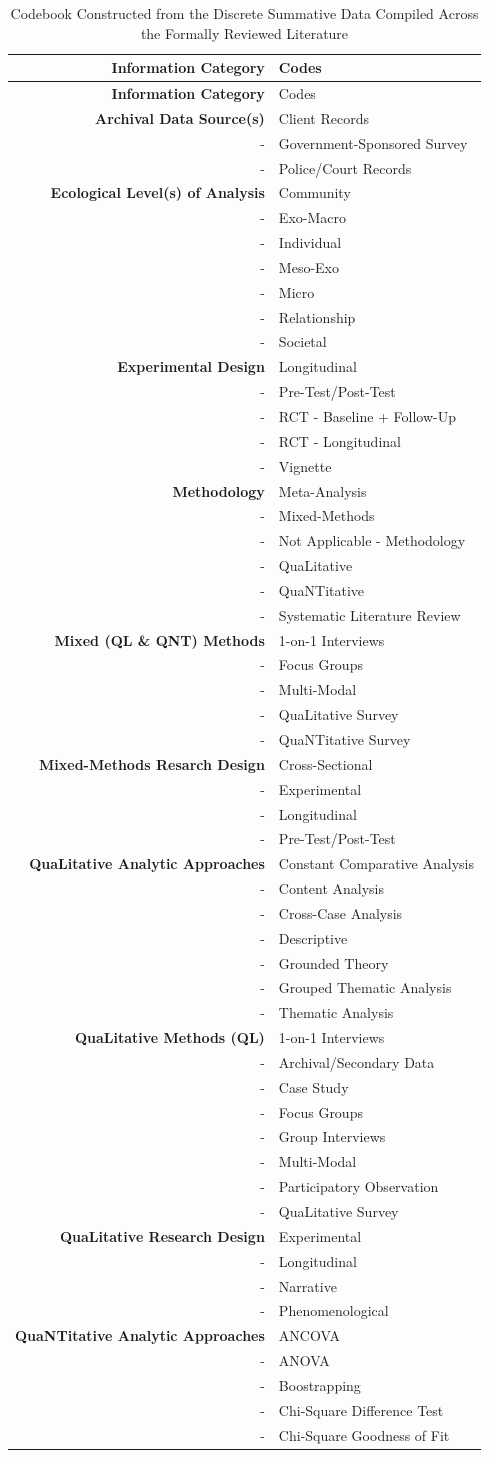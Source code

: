 \documentclass[11pt,]{tufte-book}
\begin{document}
\begin{longtable}[]{@{}rl@{}}
\caption{Codebook Constructed from the Discrete Summative Data Compiled
Across the Formally Reviewed Literature \label{tbl:cdbk}}\tabularnewline
\toprule
\textbf{Information Category} & Codes\tabularnewline
\midrule
\endfirsthead
\toprule
\textbf{Information Category} & Codes\tabularnewline
\midrule
\endhead
\textbf{Archival Data Source(s)} & Client Records\tabularnewline
- & Government-Sponsored Survey\tabularnewline
- & Police/Court Records\tabularnewline
\textbf{Ecological Level(s) of Analysis} & Community\tabularnewline
- & Exo-Macro\tabularnewline
- & Individual\tabularnewline
- & Meso-Exo\tabularnewline
- & Micro\tabularnewline
- & Relationship\tabularnewline
- & Societal\tabularnewline
\textbf{Experimental Design} & Longitudinal\tabularnewline
- & Pre-Test/Post-Test\tabularnewline
- & RCT - Baseline + Follow-Up\tabularnewline
- & RCT - Longitudinal\tabularnewline
- & Vignette\tabularnewline
\textbf{Methodology} & Meta-Analysis\tabularnewline
- & Mixed-Methods\tabularnewline
- & Not Applicable - Methodology\tabularnewline
- & QuaLitative\tabularnewline
- & QuaNTitative\tabularnewline
- & Systematic Literature Review\tabularnewline
\textbf{Mixed (QL \& QNT) Methods} & 1-on-1 Interviews\tabularnewline
- & Focus Groups\tabularnewline
- & Multi-Modal\tabularnewline
- & QuaLitative Survey\tabularnewline
- & QuaNTitative Survey\tabularnewline
\textbf{Mixed-Methods Resarch Design} & Cross-Sectional\tabularnewline
- & Experimental\tabularnewline
- & Longitudinal\tabularnewline
- & Pre-Test/Post-Test\tabularnewline
\textbf{QuaLitative Analytic Approaches} & Constant Comparative
Analysis\tabularnewline
- & Content Analysis\tabularnewline
- & Cross-Case Analysis\tabularnewline
- & Descriptive\tabularnewline
- & Grounded Theory\tabularnewline
- & Grouped Thematic Analysis\tabularnewline
- & Thematic Analysis\tabularnewline
\textbf{QuaLitative Methods (QL)} & 1-on-1 Interviews\tabularnewline
- & Archival/Secondary Data\tabularnewline
- & Case Study\tabularnewline
- & Focus Groups\tabularnewline
- & Group Interviews\tabularnewline
- & Multi-Modal\tabularnewline
- & Participatory Observation\tabularnewline
- & QuaLitative Survey\tabularnewline
\textbf{QuaLitative Research Design} & Experimental\tabularnewline
- & Longitudinal\tabularnewline
- & Narrative\tabularnewline
- & Phenomenological\tabularnewline
\textbf{QuaNTitative Analytic Approaches} & ANCOVA\tabularnewline
- & ANOVA\tabularnewline
- & Boostrapping\tabularnewline
- & Chi-Square Difference Test\tabularnewline
- & Chi-Square Goodness of Fit\tabularnewline

\end{longtable}
\end{document}
